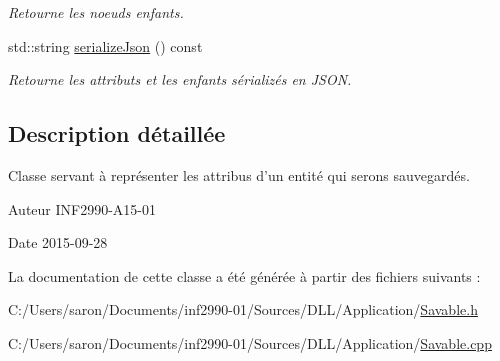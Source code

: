 \begin{DoxyCompactItemize}
\begin{DoxyCompactList}\small\item\em Retourne les noeuds enfants. \end{DoxyCompactList}\item 
std\-::string \hyperlink{group__inf2990_ga454a7c175c0864c3656283bafcb8413e}{serialize\-Json} () const 
\begin{DoxyCompactList}\small\item\em Retourne les attributs et les enfants sérializés en J\-S\-O\-N. \end{DoxyCompactList}\end{DoxyCompactItemize}


\subsection{Description détaillée}
Classe servant à représenter les attribus d'un entité qui serons sauvegardés. 

\begin{DoxyAuthor}{Auteur}
I\-N\-F2990-\/\-A15-\/01 
\end{DoxyAuthor}
\begin{DoxyDate}{Date}
2015-\/09-\/28 
\end{DoxyDate}


La documentation de cette classe a été générée à partir des fichiers suivants \-:\begin{DoxyCompactItemize}
\item 
C\-:/\-Users/saron/\-Documents/inf2990-\/01/\-Sources/\-D\-L\-L/\-Application/\hyperlink{_savable_8h}{Savable.\-h}\item 
C\-:/\-Users/saron/\-Documents/inf2990-\/01/\-Sources/\-D\-L\-L/\-Application/\hyperlink{_savable_8cpp}{Savable.\-cpp}\end{DoxyCompactItemize}

